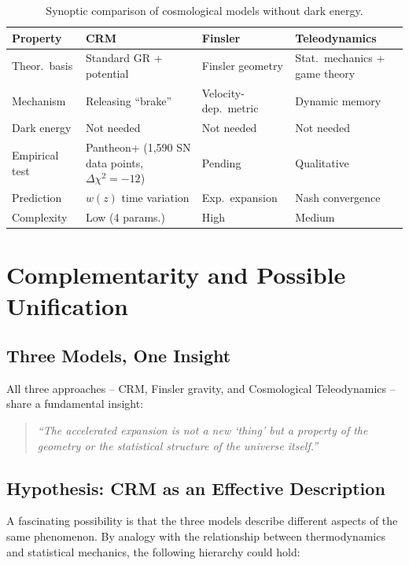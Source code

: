 \documentclass[aps,prd,twocolumn,superscriptaddress,nofootinbib]{revtex4-2}
\begin{document}
\begin{table}[htbp]
\centering
\caption{Synoptic comparison of cosmological models without dark energy.}
\label{tab:synopse}
\begin{tabular}{llll}
\toprule
\textbf{Property} & \textbf{CRM} & \textbf{Finsler} & \textbf{Teleodynamics} \\
\midrule
Theor.\ basis & Standard GR + potential & Finsler geometry & Stat.\ mechanics + game theory \\
Mechanism & Releasing ``brake'' & Velocity-dep.\ metric & Dynamic memory \\
Dark energy & Not needed & Not needed & Not needed \\
Empirical test & Pantheon+ (1,590 SN data points, $\Delta\chi^2{=}{-}12$) & Pending & Qualitative \\
Prediction & $w(z)$ time variation & Exp.\ expansion & Nash convergence \\
Complexity & Low (4 params.) & High & Medium \\
\bottomrule
\end{tabular}
\end{table}


\section{Complementarity and Possible Unification}
\label{sec:complementarity}

\subsection{Three Models, One Insight}

All three approaches -- CRM, Finsler gravity, and Cosmological Teleodynamics -- share a fundamental insight:
\begin{quote}
\textit{``The accelerated expansion is not a new `thing' but a property of the geometry or the statistical structure of the universe itself.''}
\end{quote}

\subsection{Hypothesis: CRM as an Effective Description}

A fascinating possibility is that the three models describe different aspects of the same phenomenon. By analogy with the relationship between thermodynamics and statistical mechanics, the following hierarchy could hold:
\end{document}
